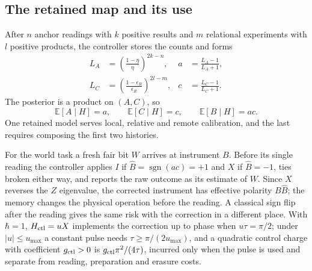 \documentclass[11pt,a4paper]{article}
\newcommand{\E}{\mathbb E}
\newcommand{\sgn}{\operatorname{sgn}}
\begin{document}
\subsection{The retained map and its use}

After $n$ anchor readings with $k$ positive results and $m$ relational experiments with $l$ positive products, the controller stores the counts and forms
\begin{align}\label{eq:odds}
 L_A&=\left(\frac{1-\eta}{\eta}\right)^{2k-n},
 & a&=\frac{L_A-1}{L_A+1},\\
 L_C&=\left(\frac{1-\epsilon_R}{\epsilon_R}\right)^{2l-m},
 & c&=\frac{L_C-1}{L_C+1}.
\end{align}
The posterior is a product on $(A,C)$, so
\begin{equation}\label{eq:product}
 \E[A\mid H]=a,\qquad \E[C\mid H]=c,\qquad \E[B\mid H]=ac.
\end{equation}
One retained model serves local, relative and remote calibration, and the last requires composing the first two histories.

For the world task a fresh fair bit $W$ arrives at instrument $B$. Before its single reading the controller applies $I$ if $\widehat B=\sgn(ac)=+1$ and $X$ if $\widehat B=-1$, ties broken either way, and reports the raw outcome as its estimate of $W$. Since $X$ reverses the $Z$ eigenvalue, the corrected instrument has effective polarity $B\widehat B$; the memory changes the physical operation before the reading. A classical sign flip after the reading gives the same risk with the correction in a different place. With $\hbar=1$, $H_{\rm ctl}=uX$ implements the correction up to phase when $u\tau=\pi/2$; under $|u|\le u_{\max}$ a constant pulse needs $\tau\ge\pi/(2u_{\max})$, and a quadratic control charge with coefficient $g_{\rm ctl}>0$ is $g_{\rm ctl}\pi^2/(4\tau)$, incurred only when the pulse is used and separate from reading, preparation and erasure costs.
\end{document}
